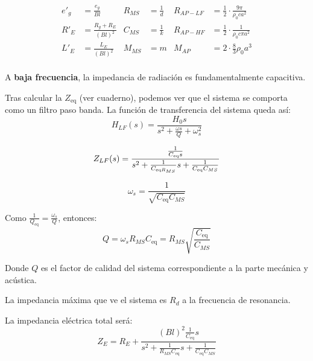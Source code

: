 \documentclass[12pt, a4paper]{article}
\begin{document}
\begin{align*}
    e'_g &= \frac{e_g}{Bl} & R_{MS} &= \frac{1}{d} & R_{AP-LF} &= \frac{1}{2} \cdot \frac{9\pi}{\rho_0ca^2} \\
    R'_E &= \frac{R_g+R_E}{\left( Bl \right)^2} & C_{MS} &= \frac{1}{k} & R_{AP-HF} &= \frac{1}{2} \cdot \frac{1}{\rho_0c\pi a^2} \\
    L'_E &= \frac{L_E}{\left( Bl \right)^2} & M_{MS} &= m & M_{AP} &= 2 \cdot \frac{8}{3} \rho_0 a^3 \\
\end{align*}

A \textbf{baja frecuencia}, la impedancia de radiación es fundamentalmente capacitiva.

Tras calcular la $Z_{\text{eq}}$ (ver cuaderno), podemos ver que el sistema se comporta como un filtro paso banda. La función de transferencia del sistema queda así:
\begin{equation} \label{eq:funcion_transferencia_altavoz_LF}
    H_{LF}(s) = \frac{H_0 s }{s^2 + \frac{\omega s }{Q } + \omega_s^2}
\end{equation}

\begin{equation} \label{eq:impedancia_altavoz_LF}
    Z_{LF}(s) = \frac{\frac{1}{C_{\text{eq}}s}}{s^2 + \frac{1}{C _{\textnormal{eq}R_{MS}}}s + \frac{1}{C_{\text{eq}}C_{MS}}}
\end{equation}

\begin{equation} \label{eq:f_res_LF}
    \omega_s = \frac{1}{\sqrt{C_{\text{eq}}C_{MS}}}
\end{equation}

Como $\frac{1}{Q _{\text{eq}}} = \frac{\omega_s}{Q}$, entonces:
\begin{equation} \label{eq:factor_calidad}
    Q = \omega_s R_{MS} C _{\text{eq}} = R_{MS} \sqrt{\frac{C _{\text{eq}}}{C_{MS}}}
\end{equation}

Donde $Q$ es el factor de calidad del sistema correspondiente a la parte mecánica y acústica.

La impedancia máxima que ve el sistema es $R_d$ a la frecuencia de resonancia.

La impedancia eléctrica total será:
\begin{equation} \label{eq:impedancia_electrica}
    Z_E = R_E + \frac{\left( Bl \right)^2 \frac{1}{C _{\text{eq}}}s}{s^2 + \frac{1}{R_{MS}C _{\text{eq}}}s + \frac{1}{C _{\text{eq}}C_{MS}}}
\end{equation}
\end{document}
